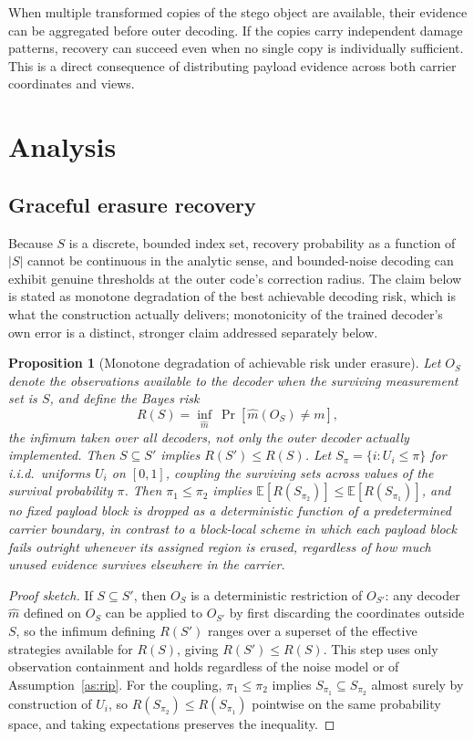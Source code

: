 \documentclass[11pt]{article}
\newtheorem{proposition}{Proposition}
\begin{document}
When multiple transformed copies of the stego object are available, their evidence can be aggregated before outer decoding. If the copies carry independent damage patterns, recovery can succeed even when no single copy is individually sufficient. This is a direct consequence of distributing payload evidence across both carrier coordinates and views.

\section{Analysis}

\subsection{Graceful erasure recovery}

Because $S$ is a discrete, bounded index set, recovery probability as a function of $|S|$ cannot be continuous in the analytic sense, and bounded-noise decoding can exhibit genuine thresholds at the outer code's correction radius. The claim below is stated as monotone degradation of the best achievable decoding risk, which is what the construction actually delivers; monotonicity of the trained decoder's own error is a distinct, stronger claim addressed separately below.

\begin{proposition}[Monotone degradation of achievable risk under erasure]
\label{prop:erasure}
Let $O_S$ denote the observations available to the decoder when the surviving measurement set is $S$, and define the Bayes risk
\[
R(S) = \inf_{\hat m}\ \Pr[\hat m(O_S) \ne m],
\]
the infimum taken over all decoders, not only the outer decoder actually implemented. Then $S \subseteq S'$ implies $R(S') \le R(S)$. Let $S_\pi = \{i : U_i \le \pi\}$ for i.i.d.\ uniforms $U_i$ on $[0,1]$, coupling the surviving sets across values of the survival probability $\pi$. Then $\pi_1 \le \pi_2$ implies $\mathbb{E}[R(S_{\pi_2})] \le \mathbb{E}[R(S_{\pi_1})]$, and no fixed payload block is dropped as a deterministic function of a predetermined carrier boundary, in contrast to a block-local scheme in which each payload block fails outright whenever its assigned region is erased, regardless of how much unused evidence survives elsewhere in the carrier.
\end{proposition}

\begin{proof}[Proof sketch]
If $S \subseteq S'$, then $O_S$ is a deterministic restriction of $O_{S'}$: any decoder $\hat m$ defined on $O_S$ can be applied to $O_{S'}$ by first discarding the coordinates outside $S$, so the infimum defining $R(S')$ ranges over a superset of the effective strategies available for $R(S)$, giving $R(S') \le R(S)$. This step uses only observation containment and holds regardless of the noise model or of Assumption~\ref{as:rip}. For the coupling, $\pi_1 \le \pi_2$ implies $S_{\pi_1} \subseteq S_{\pi_2}$ almost surely by construction of $U_i$, so $R(S_{\pi_2}) \le R(S_{\pi_1})$ pointwise on the same probability space, and taking expectations preserves the inequality.
\end{proof}
\end{document}

